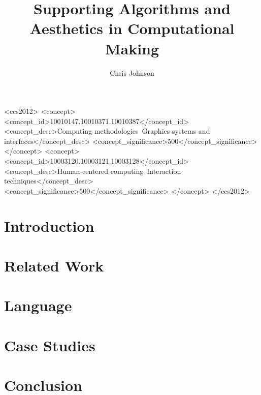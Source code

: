 \documentclass[manuscript,screen,review,anonymous=false]{acmart}
\begin{document}
\title{Supporting Algorithms and Aesthetics in Computational Making}

\author{Chris Johnson}

\renewcommand{\shortauthors}{Johnson}

\begin{abstract}

\end{abstract}

\begin{CCSXML}
<ccs2012>
   <concept>
       <concept_id>10010147.10010371.10010387</concept_id>
       <concept_desc>Computing methodologies~Graphics systems and interfaces</concept_desc>
       <concept_significance>500</concept_significance>
       </concept>
   <concept>
       <concept_id>10003120.10003121.10003128</concept_id>
       <concept_desc>Human-centered computing~Interaction techniques</concept_desc>
       <concept_significance>500</concept_significance>
       </concept>
 </ccs2012>
\end{CCSXML}



\maketitle

\section{Introduction}


\section{Related Work}


\section{Language}


% 

\section{Case Studies}


\section{Conclusion}




\end{document}
